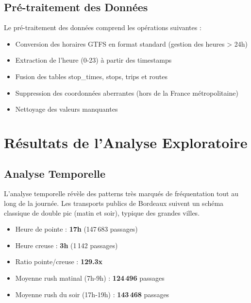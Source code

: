\documentclass[12pt,a4paper]{article}
\begin{document}
\subsection{Pré-traitement des Données}

Le pré-traitement des données comprend les opérations suivantes :

\begin{itemize}[leftmargin=2cm]
    \item Conversion des horaires GTFS en format standard (gestion des heures > 24h)
    \item Extraction de l'heure (0-23) à partir des timestamps
    \item Fusion des tables stop\_times, stops, trips et routes
    \item Suppression des coordonnées aberrantes (hors de la France métropolitaine)
    \item Nettoyage des valeurs manquantes
\end{itemize}

\newpage
\section{Résultats de l'Analyse Exploratoire}

\subsection{Analyse Temporelle}

L'analyse temporelle révèle des patterns très marqués de fréquentation tout au long de la journée. Les transports publics de Bordeaux suivent un schéma classique de double pic (matin et soir), typique des grandes villes.

\begin{infobox}
\begin{itemize}[leftmargin=0.5cm]
    \item Heure de pointe : \textbf{17h} (147\,683 passages)
    \item Heure creuse : \textbf{3h} (1\,142 passages)
    \item Ratio pointe/creuse : \textbf{129.3x}
    \item Moyenne rush matinal (7h-9h) : \textbf{124\,496} passages
    \item Moyenne rush du soir (17h-19h) : \textbf{143\,468} passages
\end{itemize}
\end{infobox}
\end{document}
